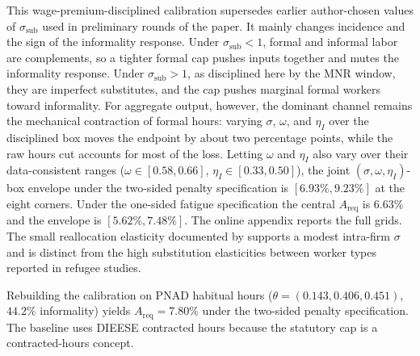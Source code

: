 This wage-premium-disciplined calibration supersedes earlier author-chosen values of $\sigma_{\text{sub}}$ used in preliminary rounds of the paper. It mainly changes incidence and the sign of the informality response. Under $\sigma_{\text{sub}}<1$, formal and informal labor are complements, so a tighter formal cap pushes inputs together and mutes the informality response. Under $\sigma_{\text{sub}}>1$, as disciplined here by the MNR window, they are imperfect substitutes, and the cap pushes marginal formal workers toward informality. For aggregate output, however, the dominant channel remains the mechanical contraction of formal hours: varying $\sigma$, $\omega$, and $\eta_I$ over the disciplined box moves the endpoint by about two percentage points, while the raw hours cut accounts for most of the loss. Letting $\omega$ and $\eta_I$ also vary over their data-consistent ranges ($\omega\in[0.58,0.66]$, $\eta_I\in[0.33,0.50]$), the joint $(\sigma,\omega,\eta_I)$-box envelope under the two-sided penalty specification is $[6.93\%, 9.23\%]$ at the eight corners. Under the one-sided fatigue specification the central $A_{\text{req}}$ is $6.63\%$ and the envelope is $[5.62\%,7.48\%]$. The online appendix reports the full grids. The small reallocation elasticity documented by \citet{DerenoncourtGerardLagosMontialoux2025} supports a modest intra-firm $\sigma$ and is distinct from the high substitution elasticities between worker types reported in refugee studies.

Rebuilding the calibration on PNAD habitual hours ($\theta=(0.143,0.406,0.451)$, $44.2\%$ informality) yields $A_{\text{req}}=7.80\%$ under the two-sided penalty specification. The baseline uses DIEESE contracted hours because the statutory cap is a contracted-hours concept.
